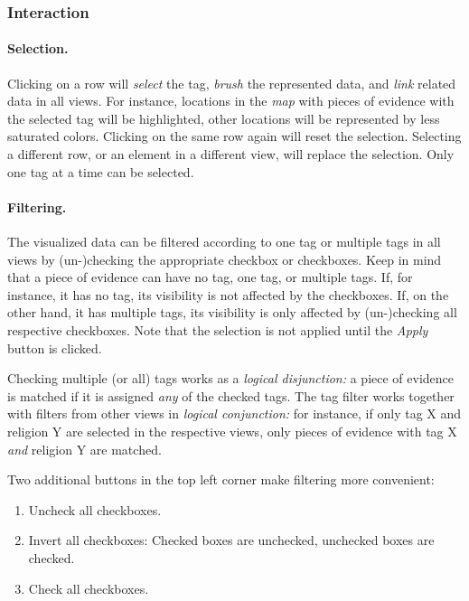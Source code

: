 \subsubsection{Interaction}
\label{sec:tags-interaction}

\paragraph{Selection.}
Clicking on a row will \emph{select} the tag, \emph{brush} the represented data, and \emph{link} related data in all views.
For instance, locations in the \emph{map} with pieces of evidence with the selected tag will be highlighted, other locations will be represented by less saturated colors.
Clicking on the same row again will reset the selection.
Selecting a different row, or an element in a different view, will replace the selection.
Only one tag at a time can be selected.

\paragraph{Filtering.}
The visualized data can be filtered according to one tag or multiple tags in all views by \mbox{(un-)}checking the appropriate checkbox or checkboxes.
Keep in mind that a piece of evidence can have no tag, one tag, or multiple tags.
If, for instance, it has no tag, its visibility is not affected by the checkboxes.
If, on the other hand, it has multiple tags, its visibility is only affected by (un-)checking all respective checkboxes.
Note that the selection is not applied until the \emph{Apply} button is clicked.

Checking multiple (or all) tags works as a \emph{logical disjunction:}
a piece of evidence is matched if it is assigned \emph{any} of the checked tags.
The tag filter works together with filters from other views in \emph{logical conjunction:}
for instance, if only tag X and religion Y are selected in the respective views, only pieces of evidence with tag X \emph{and} religion Y are matched.

Two additional buttons in the top left corner make filtering more convenient:

\begin{enumerate}
  \item Uncheck all checkboxes.
  \item Invert all checkboxes:
    Checked boxes are unchecked, unchecked boxes are checked.
  \item Check all checkboxes.
\end{enumerate}

